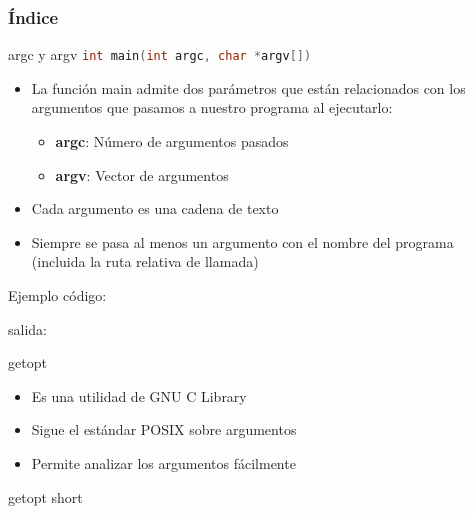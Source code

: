 \documentclass{mybeamer}
\institute{
	{\textsl{\large Tema 8}}
	\\[1em]
	\textbf{\Large Argumentos de main}
}
\begin{document}
\begin{frame}
\titlepage
\end{frame}

\begin{frame}
\frametitle{Índice}
	\tableofcontents
\end{frame}

\begin{framesec}{argc y argv}
	\centering
	\lstinline[language=C, basicstyle=\Large]|int main(int argc, char *argv[])|
	\\[2em]
	\begin{itemize}
		\item La función main admite dos parámetros que están
			relacionados con los argumentos que pasamos a nuestro
			programa al ejecutarlo:
		\begin{itemize}
			\item \textbf{argc}: Número de argumentos pasados
			\item \textbf{argv}: Vector de argumentos
		\end{itemize}

		\item Cada argumento es una cadena de texto
		\item Siempre se pasa al menos un argumento con el nombre del
			programa (incluida la ruta relativa de llamada)
	\end{itemize}
\end{framesec}

\begin{framesubsec}{Ejemplo}
	código:
	
	salida:
	
\end{framesubsec}

\begin{framesec}{getopt}
	\begin{itemize}
		\item Es una utilidad de GNU C Library
		\item Sigue el estándar POSIX sobre argumentos
		\item Permite analizar los argumentos fácilmente
	\end{itemize}
\end{framesec}

\begin{framesec}{getopt short}
	\centering
	\only<1| handout:1>{
		\lstinline[language=bash]|> gopts -a -b 3 -c hola|
		\vspace{1em}
		
	}
	\only<2| handout:2>{
		
		\vspace{1em}
		
	}
\end{framesec}
\end{document}

